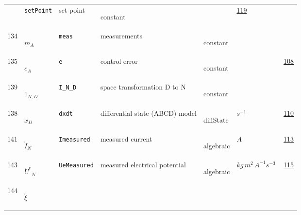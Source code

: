 \begin{longtable}{|p{1cm}|p{2.5cm}|p{4.5cm}|p{8cm}|p{3.0cm}|p{3cm}|p{1cm}|}
             & \verb|setPoint|
             & set point
             & \begin{lay}constant \end{lay}
             & $  $
             & \hyperlink{"e:119"}{ 119 }
                 \\
    134
             & \hypertarget{"v:134"}{ $ {m}{_{A}} $}
             & \verb|meas|
             & measurements
             & \begin{lay}constant \end{lay}
             & $  $
             & \\
    135
             & \hypertarget{"v:135"}{ $ {e}{_{A}} $}
             & \verb|e|
             & control error
             & \begin{lay}constant \end{lay}
             & $  $
             & \hyperlink{"e:108"}{ 108 }
                 \\
    139
             & \hypertarget{"v:139"}{ $ {1}{_{N, D}} $}
             & \verb|I_N_D|
             & space transformation D to N
             & \begin{lay}constant \end{lay}
             & $  $
             & \\
    138
             & \hypertarget{"v:138"}{ $ {{\dot{x}}}{_{D}} $}
             & \verb|dxdt|
             & differential state (ABCD) model
             & \begin{lay}diffState \end{lay}
             & $ s^{-1} \, $
             & \hyperlink{"e:110"}{ 110 }
                 \\
    141
             & \hypertarget{"v:141"}{ $ {{\check{I}}}{_{N}} $}
             & \verb|Imeasured|
             & measured current
             & \begin{lay}algebraic \end{lay}
             & $ A \, $
             & \hyperlink{"e:113"}{ 113 }
                 \\
    143
             & \hypertarget{"v:143"}{ $ {{\check{U}^e}}{_{N}} $}
             & \verb|UeMeasured|
             & measured electrical potential
             & \begin{lay}algebraic \end{lay}
             & $ kg \,m^{2} \,A^{-1} s^{-3} \, $
             & \hyperlink{"e:115"}{ 115 }
                 \\
    144
             & \hypertarget{"v:144"}{ $ {{\check{\xi}}}{_{}} $}

\end{longtable}
